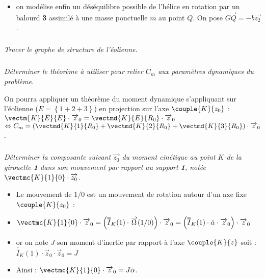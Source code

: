 \begin{multicols}{2}
\begin{itemize}
\item on modélise enfin un déséquilibre possible de l'hélice en rotation par un balourd \textbf{3} assimilé à une masse ponctuelle $m$ au point $Q$. On pose $\overrightarrow{GQ}=-b\overrightarrow{z_2}$.
\end{itemize}

\fi

\subparagraph{} \textit{Tracer le graphe de structure de l'éolienne.}
\ifprof
\begin{corrige}

\end{corrige}
\else
\fi


\subparagraph{} \textit{Déterminer le théorème à utiliser pour relier $C_m$ aux paramètres dynamiques du problème.}
\ifprof
\begin{corrige}
On pourra appliquer un théorème du moment dynamique s'appliquant sur l'éolienne ($E=\left\{1+2+3\right\}$) en projection sur l'axe $\couple{K}{{z}_0}$  : 
$\vectm{K}{\bar E}{E}\cdot \overrightarrow{z}_0=\vectmd{K}{E}{R_0}\cdot \overrightarrow{z}_0$
$\Leftrightarrow
C_m=\left(\vectmd{K}{1}{R_0}+\vectmd{K}{2}{R_0}+\vectmd{K}{3}{R_0}\right)\cdot \overrightarrow{z}_0$.
\end{corrige}
\else
\fi


\subparagraph{} \textit{Déterminer la composante suivant $\overrightarrow{z_0}$ du moment cinétique au point $K$ de la girouette \textbf{1} dans son mouvement par rapport au support \textbf{1}, notée $ \vectmc{K}{1}{0}\cdot\overrightarrow{z_0}$.}
\ifprof
\begin{corrige}
\begin{itemize}
\item Le mouvement de $1/0$ est un mouvement de rotation autour d'un axe fixe $\couple{K}{{z}_0}$ : 

\item $\vectmc{K}{1}{0}\cdot \overrightarrow{z}_0=\left(\overline{\overline{I}}_K(1)\cdot \overrightarrow{\Omega}(1/0)\right)\cdot \overrightarrow{z}_0=\left(\overline{\overline{I}}_K(1)\cdot \dot{\alpha}\cdot \overrightarrow{z}_0 \right)\cdot \overrightarrow{z}_0$

\item or on note $J$ son moment d'inertie par rapport à l'axe $\couple{K}{{z}}$ soit : 
$
\overline{\overline{I}}_K(1)\cdot\overrightarrow{z}_0\cdot \overrightarrow{z}_0=J
$

\item Ainsi : 
$
\vectmc{K}{1}{0}\cdot \overrightarrow{z}_0=J \dot{\alpha}
$.
\end{itemize}
\end{corrige}
\else
\fi



\end{multicols}
